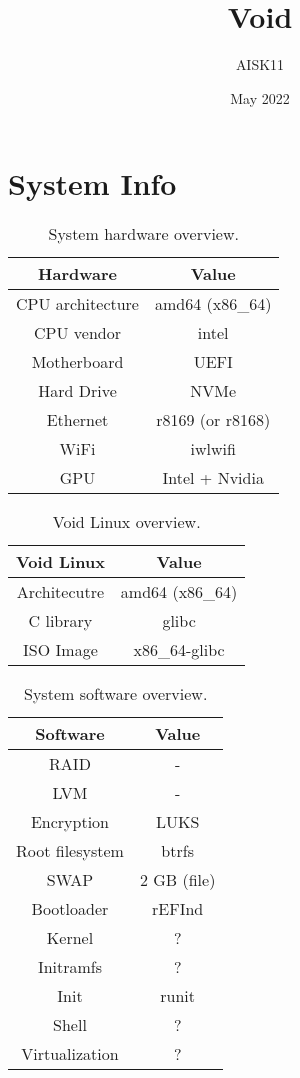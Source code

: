 \documentclass[10pt, a4paper, onecolumn, oneside, titlepage, openany]{book}
\title{\textbf{Void}}
\author{AISK11}
\date{May 2022}
\begin{document}
\maketitle
\tableofcontents

\chapter{System Info}
\begin{table}[!ht]
\centering
\begin{tabular}{|c|c|}
    \hline
    \textbf{Hardware} & \textbf{Value} \\
    \hline
    CPU architecture & amd64 (x86\_64)\\
    CPU vendor & intel\\
    Motherboard & UEFI\\
    Hard Drive & NVMe\\
    Ethernet & r8169 (or r8168)\\
    WiFi & iwlwifi\\
    GPU & Intel + Nvidia\\
    \hline
\end{tabular}
\caption{System hardware overview.}
\label{table:system_hardware_overview}
\end{table}

\begin{table}[!ht]
\centering
\begin{tabular}{|c|c|}
    \hline
    \textbf{Void Linux} & \textbf{Value} \\
    \hline
    Architecutre & amd64 (x86\_64)\\
    C library & glibc\\
    ISO Image & x86\_64-glibc\\
    \hline
\end{tabular}
\caption{Void Linux overview.}
\label{table:void_linux_overview}
\end{table}

\begin{table}[!ht]
\centering
\begin{tabular}{|c|c|}
    \hline
    \textbf{Software} & \textbf{Value} \\
    \hline
    RAID & -\\
    LVM & -\\
    Encryption & LUKS\\
    Root filesystem & btrfs\\
    SWAP & 2 GB (file)\\
    Bootloader & rEFInd\\
    Kernel & ?\\
    Initramfs & ?\\
    Init & runit\\
    Shell & ?\\
    Virtualization & ?\\
    \hline
\end{tabular}
\caption{System software overview.}
\label{table:system_software_overview}
\end{table}
\end{document}
